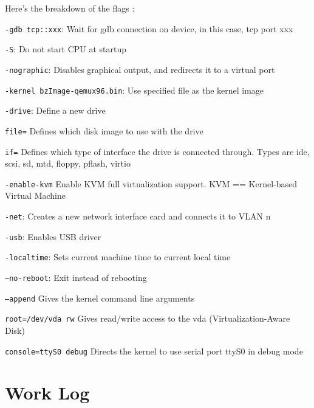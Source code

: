 \documentclass[10pt,letterpaper]{article}
\begin{document}
      \noindent Here's the breakdown of the flags \cite{anthonyl.2010}: \\
      \begin{description}
          \item \texttt{-gdb tcp::xxx}: Wait for gdb connection on device, in
          this case, tcp port xxx
          \item \texttt{-S}: Do not start CPU at startup
          \item \texttt{-nographic}: Disables graphical output, and redirects it
          to a virtual port
          \item \texttt{-kernel bzImage-qemux96.bin}: Use specified file as the
          kernel image
          \item \texttt{-drive}: Define a new drive
          \begin{description}
            \item \texttt{file=} Defines which disk image to use with the drive
            \item \texttt{if=} Defines which type of interface the drive is connected
            through. Types are ide, scsi, sd, mtd, floppy, pflash, virtio
          \end{description}
          \item \texttt{-enable-kvm} Enable KVM full virtualization support. KVM
          == Kernel-based Virtual Machine
          \item \texttt{-net}: Creates a new network interface card and connects
          it to VLAN n
          \item \texttt{-usb}: Enables USB driver
          \item \texttt{-localtime}: Sets current machine time to current local
          time
          \item \texttt{--no-reboot}: Exit instead of rebooting
          \item \texttt{--append} Gives the kernel command line arguments
          \begin{description}
            \item \texttt{root=/dev/vda rw} Gives read/write access to the vda
            (Virtualization-Aware Disk)
            \item \texttt{console=ttyS0 debug} Directs the kernel to use serial
            port ttyS0 in debug mode
          \end{description}
      \end{description}
\section{Work Log}
\end{document}
